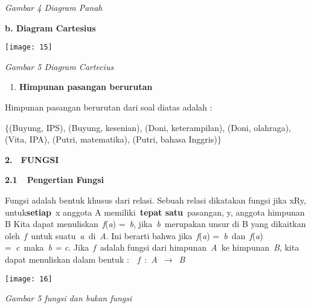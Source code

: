 \documentclass[11pt,fleqn]{book} %
\begin{document}
\noindent 

\noindent 

\noindent \textit{Gambar 4 Diagram Panah}

\noindent \textbf{b. Diagram Cartesius}

\begin{center}
\noindent \texttt{[image: 15]}
\end{center}

\noindent \textit{Gambar 5 Diagram Cartecius}

\noindent \textbf{}

\begin{enumerate}
\item \textbf{ Himpunan pasangan berurutan}
\end{enumerate}

\noindent Himpunan pasangan berurutan dari soal diatas adalah :

\noindent 

\noindent $\{$(Buyung, IPS), (Buyung, kesenian), (Doni, keterampilan), (Doni, olahraga), (Vita, IPA), (Putri, matematika), (Putri, bahasa Inggris)$\}$

\noindent 

\noindent 

\noindent \eject 

\noindent \textbf{2.}~~\textbf{FUNGSI}

\noindent \textbf{2.1~~Pengertian Fungsi}

\noindent \textbf{}

Fungsi adalah bentuk khusus dari relasi. Sebuah relasi dikatakan fungsi jika xRy, untuk\textbf{setiap}~x anggota A memiliki~\textbf{tepat satu}~pasangan, y, anggota himpunan B Kita dapat menuliskan~\textit{f}(\textit{a}) =~\textit{b}, jika~\textit{b~}merupakan unsur di B yang dikaitkan oleh~\textit{f~}untuk suatu~\textit{a~}di~\textit{A}. Ini berarti bahwa jika~\textit{f}(\textit{a}) =~\textit{b~}dan~\textit{f}(\textit{a}) =~\textit{c~}maka~\textit{b = c}. Jika~\textit{f~}adalah fungsi dari himpunan~\textit{A~}ke himpunan~\textit{B}, kita dapat menuliskan dalam bentuk :~~\textit{f~}:~\textit{A~}$\mathrm{\to}$~\textit{B}

\noindent 

\begin{center}
\noindent \texttt{[image: 16]}
\end{center}

\noindent \textit{Gambar 5 fungsi dan bukan fungsi}
\end{document}
